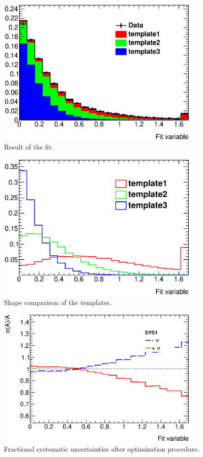 \documentclass[12pt]{article}
\begin{document}
\begin{figure}[hbtp]
\begin{center}
\includegraphics[width=10cm]{pics/result.eps}
\caption{Result of the fit.}
\label{fig:result}
\end{center}
\end{figure}

\begin{figure}[hbtp]
\begin{center}
\includegraphics[width=10cm]{pics/shape.eps}
\caption{Shape comparison of the templates.}
\label{fig:shape}
\end{center}
\end{figure}

\begin{figure}[hbtp]
\begin{center}
\includegraphics[width=10cm]{pics/sys.eps}
\caption{Fractional systematic uncertainties after optimization
procedure.}
\label{fig:sys}
\end{center}
\end{figure}
\end{document}
